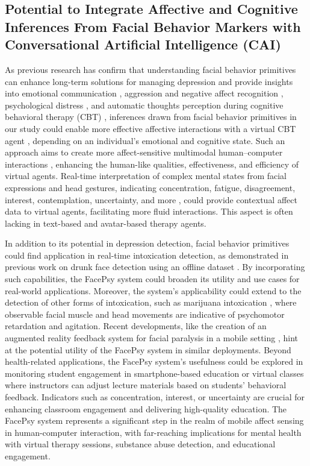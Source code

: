 \subsection{Potential to Integrate Affective and Cognitive Inferences From Facial Behavior Markers with Conversational Artificial Intelligence (CAI)}
As previous research has confirm that understanding facial behavior primitives can enhance long-term solutions for managing depression and provide insights into emotional communication \cite{hammal2014intra}, aggression and negative affect recognition \cite{fitrianie2023head}, psychological distress \cite{stratou2017multisense}, and automatic thoughts perception during cognitive behavioral therapy (CBT) \cite{shidara2022automatic, shidara2020analysis}, inferences drawn from facial behavior primitives in our study could enable more effective affective interactions \cite{conati2005affective, islam2023revolutionizing} with a virtual CBT agent \cite{shidara2022automatic, shidara2020analysis}, depending on an individual’s emotional and cognitive state. Such an approach aims to create more affect-sensitive multimodal human–computer interactions \cite{pantic2003toward}, enhancing the human-like qualities, effectiveness, and efficiency of virtual agents. Real-time interpretation of complex mental states from facial expressions and head gestures, indicating concentration, fatigue, disagreement, interest, contemplation, uncertainty, and more \cite{el2005real}, could provide contextual affect data to virtual agents, facilitating more fluid interactions. This aspect is often lacking in text-based and avatar-based therapy agents.

In addition to its potential in depression detection, facial behavior primitives could find application in real-time intoxication detection, as demonstrated in previous work on drunk face detection using an offline dataset \cite{mehta2019dif}. By incorporating such capabilities, the FacePsy system could broaden its utility and use cases for real-world applications. Moreover, the system's applicability could extend to the detection of other forms of intoxication, such as marijuana intoxication \cite{bae2021mobile, chung2020mobile}, where observable facial muscle and head movements are indicative of psychomotor retardation and agitation. Recent developments, like the creation of an augmented reality feedback system for facial paralysis in a mobile setting \cite{barrios2021farapy}, hint at the potential utility of the FacePsy system in similar deployments. Beyond health-related applications, the FacePsy system's usefulness could be explored in monitoring student engagement in smartphone-based education or virtual classes \cite{islam2023microflow} where instructors can adjust lecture materials based on students' behavioral feedback. Indicators such as concentration, interest, or uncertainty are crucial for enhancing classroom engagement and delivering high-quality education. The FacePsy system represents a significant step in the realm of mobile affect sensing in human-computer interaction, with far-reaching implications for mental health with virtual therapy sessions, substance abuse detection, and educational engagement. 